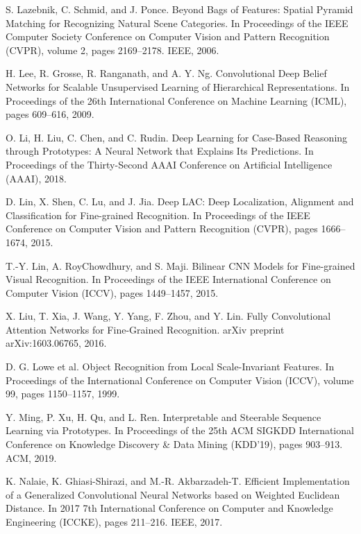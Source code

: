 \documentclass{article}
\theoremstyle{definition}
\theoremstyle{remark}
\begin{document}
\begin{thebibliography}{}
 S. Lazebnik, C. Schmid, and J. Ponce. Beyond Bags of Features: Spatial Pyramid Matching for Recognizing Natural Scene Categories. In Proceedings of the IEEE Computer Society Conference on Computer Vision and Pattern Recognition (CVPR), volume 2, pages 2169–2178. IEEE, 2006.

 H. Lee, R. Grosse, R. Ranganath, and A. Y. Ng. Convolutional Deep Belief Networks for Scalable Unsupervised Learning of Hierarchical Representations. In Proceedings of the 26th International Conference on Machine Learning (ICML), pages 609–616, 2009.

 O. Li, H. Liu, C. Chen, and C. Rudin. Deep Learning for Case-Based Reasoning through Prototypes: A Neural Network that Explains Its Predictions. In Proceedings of the Thirty-Second AAAI Conference on Artificial Intelligence (AAAI), 2018.

 D. Lin, X. Shen, C. Lu, and J. Jia. Deep LAC: Deep Localization, Alignment and Classification for Fine-grained Recognition. In Proceedings of the IEEE Conference on Computer Vision and Pattern Recognition (CVPR), pages 1666–1674, 2015.

 T.-Y. Lin, A. RoyChowdhury, and S. Maji. Bilinear CNN Models for Fine-grained Visual Recognition. In Proceedings of the IEEE International Conference on Computer Vision (ICCV), pages 1449–1457, 2015.

 X. Liu, T. Xia, J. Wang, Y. Yang, F. Zhou, and Y. Lin. Fully Convolutional Attention Networks for Fine-Grained Recognition. arXiv preprint arXiv:1603.06765, 2016.

 D. G. Lowe et al. Object Recognition from Local Scale-Invariant Features. In Proceedings of the International Conference on Computer Vision (ICCV), volume 99, pages 1150–1157, 1999.

 Y. Ming, P. Xu, H. Qu, and L. Ren. Interpretable and Steerable Sequence Learning via Prototypes. In Proceedings of the 25th ACM SIGKDD International Conference on Knowledge Discovery \& Data Mining (KDD’19), pages 903–913. ACM, 2019.

 K. Nalaie, K. Ghiasi-Shirazi, and M.-R. Akbarzadeh-T. Efficient Implementation of a Generalized Convolutional Neural Networks based on Weighted Euclidean Distance. In 2017 7th International Conference on Computer and Knowledge Engineering (ICCKE), pages 211–216. IEEE, 2017.


\end{thebibliography}
\end{document}

